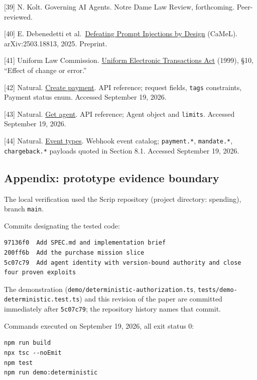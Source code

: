 \documentclass[
  11pt,
  letterpaper,
]{article}
\begin{document}
{[}39{]} N. Kolt. Governing AI Agents. Notre Dame Law Review,
forthcoming. Peer-reviewed.

{[}40{]} E. Debenedetti et
al.~\href{https://arxiv.org/abs/2503.18813}{Defeating Prompt Injections
by Design} (CaMeL). arXiv:2503.18813, 2025. Preprint.

{[}41{]} Uniform Law Commission.
\href{https://www.uniformlaws.org/committees/community-home?CommunityKey=2c04b76c-2b7d-4399-977e-d5876ba7e034}{Uniform
Electronic Transactions Act} (1999), §10, ``Effect of change or error.''

{[}42{]} Natural.
\href{https://docs.natural.com/api-reference/payments/create-payment}{Create
payment}. API reference; request fields, \texttt{tags} constraints,
Payment status enum. Accessed September 19, 2026.

{[}43{]} Natural.
\href{https://docs.natural.com/api-reference/agents/get-agent}{Get
agent}. API reference; Agent object and \texttt{limits}. Accessed
September 19, 2026.

{[}44{]} Natural.
\href{https://docs.natural.com/api-reference/event-catalog}{Event
types}. Webhook event catalog; \texttt{payment.*}, \texttt{mandate.*},
\texttt{chargeback.*} payloads quoted in Section 8.1. Accessed September
19, 2026.

\subsection{Appendix: prototype evidence
boundary}\label{appendix-prototype-evidence-boundary}

The local verification used the Scrip repository (project directory:
spending), branch \texttt{main}.

Commits designating the tested code:

\begin{verbatim}
97136f0  Add SPEC.md and implementation brief
200ff6b  Add the purchase mission slice
5c07c79  Add agent identity with version-bound authority and close four proven exploits
\end{verbatim}

The demonstration (\texttt{demo/deterministic-authorization.ts},
\texttt{tests/demo-deterministic.test.ts}) and this revision of the
paper are committed immediately after \texttt{5c07c79}; the repository
history names that commit.

Commands executed on September 19, 2026, all exit status 0:

\begin{verbatim}
npm run build
npx tsc --noEmit
npm test
npm run demo:deterministic
\end{verbatim}
\end{document}
